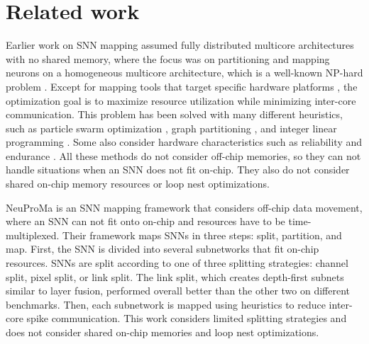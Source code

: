 \section{Related work} \label{sec:related_work}

Earlier work on SNN mapping assumed fully distributed multicore architectures with no shared memory, where the focus was on partitioning and mapping neurons on a homogeneous multicore architecture, which is a well-known NP-hard problem \cite{huynh2022implementing}. Except for mapping tools that target specific hardware platforms \cite{10.1145/3192366.3192371}, the optimization goal is to maximize resource utilization while minimizing inter-core communication. This problem has been solved with many different heuristics, such as particle swarm optimization \cite{8342201, 10.1145/3386263.3406900}, graph partitioning \cite{titirsha2020thermal, 9996702}, and integer linear programming \cite{das2022realtime}. Some also consider hardware characteristics such as reliability and endurance \cite{titirsha2021endurance}. All these methods do not consider off-chip memories, so they can not handle situations when an SNN does not fit on-chip. They also do not consider shared on-chip memory resources or loop nest optimizations.

NeuProMa \cite{neuproma} is an SNN mapping framework that considers off-chip data movement, where an SNN can not fit onto on-chip and resources have to be time-multiplexed. Their framework maps SNNs in three steps: split, partition, and map. First, the SNN is divided into several subnetworks that fit on-chip resources. SNNs are split according to one of three splitting strategies: channel split, pixel split, or link split. The link split, which creates depth-first subnets similar to layer fusion, performed overall better than the other two on different benchmarks. Then, each subnetwork is mapped using heuristics to reduce inter-core spike communication. This work considers limited splitting strategies and does not consider shared on-chip memories and loop nest optimizations.

